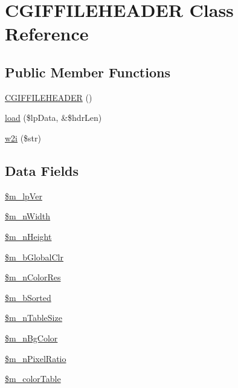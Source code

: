 \hypertarget{class_c_g_i_f_f_i_l_e_h_e_a_d_e_r}{\section{\-C\-G\-I\-F\-F\-I\-L\-E\-H\-E\-A\-D\-E\-R \-Class \-Reference}
\label{class_c_g_i_f_f_i_l_e_h_e_a_d_e_r}
}
\subsection*{\-Public \-Member \-Functions}
\begin{DoxyCompactItemize}
\item 
\hyperlink{class_c_g_i_f_f_i_l_e_h_e_a_d_e_r_a653472030065ddebcfea3143491fa843}{\-C\-G\-I\-F\-F\-I\-L\-E\-H\-E\-A\-D\-E\-R} ()
\item 
\hyperlink{class_c_g_i_f_f_i_l_e_h_e_a_d_e_r_a39c13eb3697645fc29b12bffe09826a0}{load} (\$lp\-Data, \&\$hdr\-Len)
\item 
\hyperlink{class_c_g_i_f_f_i_l_e_h_e_a_d_e_r_abb8cc80a6812d7c5476d1eab3bade1cc}{w2i} (\$str)
\end{DoxyCompactItemize}
\subsection*{\-Data \-Fields}
\begin{DoxyCompactItemize}
\item 
\hyperlink{class_c_g_i_f_f_i_l_e_h_e_a_d_e_r_a026531f676e806e1381a8c0532b084bf}{\$m\-\_\-lp\-Ver}
\item 
\hyperlink{class_c_g_i_f_f_i_l_e_h_e_a_d_e_r_ad30af53763e84b5b9bec01595ccf9598}{\$m\-\_\-n\-Width}
\item 
\hyperlink{class_c_g_i_f_f_i_l_e_h_e_a_d_e_r_ab3bbe2d26a618a3b92da277e120b9ebc}{\$m\-\_\-n\-Height}
\item 
\hyperlink{class_c_g_i_f_f_i_l_e_h_e_a_d_e_r_a4b8efbf47c67f2369102f07264d165dc}{\$m\-\_\-b\-Global\-Clr}
\item 
\hyperlink{class_c_g_i_f_f_i_l_e_h_e_a_d_e_r_a9c00391316e2b9105cea37d5175330ac}{\$m\-\_\-n\-Color\-Res}
\item 
\hyperlink{class_c_g_i_f_f_i_l_e_h_e_a_d_e_r_a3f19f097a290d16035e4c27eb90bb13c}{\$m\-\_\-b\-Sorted}
\item 
\hyperlink{class_c_g_i_f_f_i_l_e_h_e_a_d_e_r_a6d37a6f1fbdab74c9cf95a77ee5fe6ca}{\$m\-\_\-n\-Table\-Size}
\item 
\hyperlink{class_c_g_i_f_f_i_l_e_h_e_a_d_e_r_a7d0d3e2e7726635f1e86b314008677a7}{\$m\-\_\-n\-Bg\-Color}
\item 
\hyperlink{class_c_g_i_f_f_i_l_e_h_e_a_d_e_r_a4c6a36422a5a0fb21cf07012219f49af}{\$m\-\_\-n\-Pixel\-Ratio}
\item 
\hyperlink{class_c_g_i_f_f_i_l_e_h_e_a_d_e_r_ad3ef74e98fdac9e41e79be4f010029be}{\$m\-\_\-color\-Table}
\end{DoxyCompactItemize}


